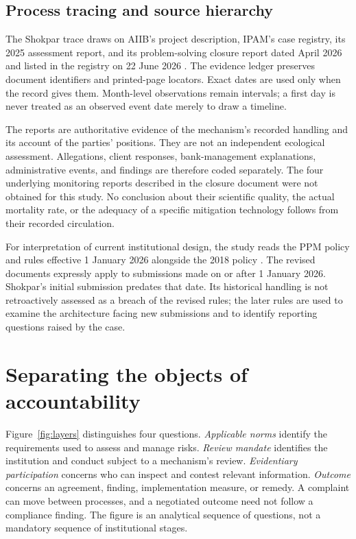 \documentclass[11pt,a4paper]{article}
\begin{document}
\subsection{Process tracing and source hierarchy}
The Shokpar trace draws on AIIB's project description, IPAM's case registry, its 2025 assessment report, and its problem-solving closure report dated April 2026 and listed in the registry on 22 June 2026 \citep{shokparproject,shokparregistry,shokparassessment,shokparclosure}. The evidence ledger preserves document identifiers and printed-page locators. Exact dates are used only when the record gives them. Month-level observations remain intervals; a first day is never treated as an observed event date merely to draw a timeline.

The reports are authoritative evidence of the mechanism's recorded handling and its account of the parties' positions. They are not an independent ecological assessment. Allegations, client responses, bank-management explanations, administrative events, and findings are therefore coded separately. The four underlying monitoring reports described in the closure document were not obtained for this study. No conclusion about their scientific quality, the actual mortality rate, or the adequacy of a specific mitigation technology follows from their recorded circulation.

For interpretation of current institutional design, the study reads the PPM policy and rules effective 1 January 2026 alongside the 2018 policy \citep{ppm2026,rules2026,ppm2018}. The revised documents expressly apply to submissions made on or after 1 January 2026. Shokpar's initial submission predates that date. Its historical handling is not retroactively assessed as a breach of the revised rules; the later rules are used to examine the architecture facing new submissions and to identify reporting questions raised by the case.

\section{Separating the objects of accountability}
Figure~\ref{fig:layers} distinguishes four questions. \emph{Applicable norms} identify the requirements used to assess and manage risks. \emph{Review mandate} identifies the institution and conduct subject to a mechanism's review. \emph{Evidentiary participation} concerns who can inspect and contest relevant information. \emph{Outcome} concerns an agreement, finding, implementation measure, or remedy. A complaint can move between processes, and a negotiated outcome need not follow a compliance finding. The figure is an analytical sequence of questions, not a mandatory sequence of institutional stages.
\end{document}
